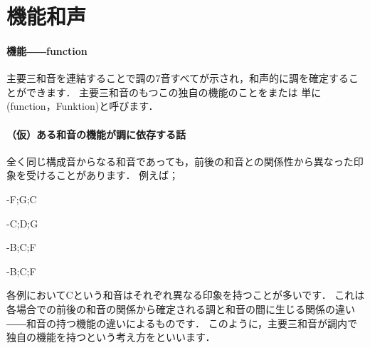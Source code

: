 \documentclass[dvipdfmx,uplatex,b5paper,openany,jbase=12Q,nomag*,textwidth-limit=44%
               ]{gachimuchi}[2020/05/05]
\begin{document}
\begin{Music}[.6\linewidth]
  \nostartrule%
  \Startpiece%
  \Notes{}%
  \zchordsll{\Gniv}%
  \zchordsll{\Gni}%
  \zchordsll{\Gnv}%
  \en{}\changecontext%
  \Notes{}%
  \zchordsll{\Gniv\Min}%
  \zchordsll{\Gni\Min}%
  \zchordsll{\Gnv}%
  \en%
  \endpiece
\end{Music}

\section{機能和声}
\paragraph{機能――function}
主要三和音を連結することで調の7音すべてが示され，和声的に調を確定することができます．
主要三和音のもつこの独自の機能のことをまたは
単に\xkanjispace(function，Funktion)と呼びます．

\paragraph{（仮）ある和音の機能が調に依存する話}
全く同じ構成音からなる和音であっても，前後の和音との関係性から異なった印象を受けることがあります．
例えば；
\begin{enumerate}
  \begin{minipage}{.45\linewidth}%
  \item \CProgl-{F;G;C}%
  \item \CProgl-{C;D;G}%
  \end{minipage}
  \begin{minipage}{.45\linewidth}%
  \item \CProgl-{B\aFlat;C;F}%
  \item \CProgl-{B\aFlat\Min;C;F\Min}%
  \end{minipage}
\end{enumerate}

各例においてCという和音はそれぞれ異なる印象を持つことが多いです．
これは各場合での前後の和音の関係から確定される調と和音の間に生じる関係の違い――和音の持つ機能の違いによるものです．
このように，主要三和音が調内で独自の機能を持つという考え方をといいます．
\end{document}
